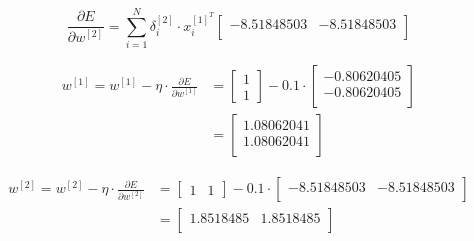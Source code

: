\documentclass[12pt]{article}
\begin{document}
\begin{enumerate}[leftmargin=\labelsep]
        \begin{equation*}
          \frac{\partial E}{\partial w^{[2]}}
          = \sum_{i=1}^N \delta_i^{[2]}
          \cdot x_i^{[1]^T}
          \begin{bmatrix}
            -8.51848503 & -8.51848503\\
          \end{bmatrix}
        \end{equation*}

        \begin{equation*}
          \begin{aligned}
            w^{[1]} = w^{[1]} - \eta \cdot \frac{\partial E}{\partial w^{[1]}}
             & = \begin{bmatrix}
                   1 \\
                   1
                 \end{bmatrix} - 0.1 \cdot \begin{bmatrix}
                  -0.80620405\\
                  -0.80620405\\
                \end{bmatrix} \\
             & = \begin{bmatrix}
              1.08062041\\
              1.08062041\\
            \end{bmatrix}
          \end{aligned}
        \end{equation*}

        \begin{equation*}
          \begin{aligned}
            w^{[2]} = w^{[2]} - \eta \cdot \frac{\partial E}{\partial w^{[2]}}
             & = \begin{bmatrix}
                   1 & 1
                 \end{bmatrix} - 0.1 \cdot
                 \begin{bmatrix}
                   -8.51848503 & -8.51848503\\
                 \end{bmatrix} \\
             & = \begin{bmatrix}
              1.8518485 & 1.8518485\\
            \end{bmatrix}
          \end{aligned}
        \end{equation*}


\end{enumerate}
\end{document}
